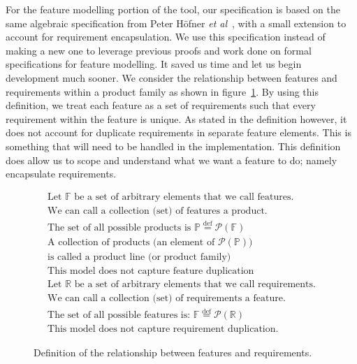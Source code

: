 For the feature modelling portion of the tool, our specification is based on the same algebraic specification from Peter H\"{o}fner \textit{et al}~\cite{hofner2006feature,hofner2011algebra}, with a small extension to account for requirement encapsulation. We use this specification instead of making a new one to leverage previous proofs and work done on formal specifications for feature modelling. It saved us time and let us begin development much sooner. We consider the relationship between features and requirements within a product family as shown in figure~\ref{fig:spec}. By using this definition, we treat each feature as a set of requirements such that every requirement within the feature is unique. As stated in the definition however, it does not account for duplicate requirements in separate feature elements. This is something that will need to be handled in the implementation. This definition does allow us to scope and understand what we want a feature to do; namely encapsulate requirements.
\begin{figure}
\begin{align}
	\text{Let } \mathbb{F} \text{ be a set of arbitrary elements that we call features.}\\
		\text{We can call a collection (set) of features a product.}\\
		\text{The set of all possible products is } \mathbb{P} \overset{\mathrm{def}}{=} \mathcal{P}(\mathbb{F})\\
		\text{A collection of products (an element of } \mathcal{P}(\mathbb{P})\text{)}\\
		\text{is called a product line (or product family)}\\
		\text{This model does not capture feature duplication}\\
		\text{Let } \mathbb{R} \text{ be a set of arbitrary elements that we call requirements.}\\
		\text{We can call a collection (set) of requirements a feature.}\\
		\text{The set of all possible features is: } \mathbb{F} \overset{\mathrm{def}}{=} \mathcal{P}(\mathbb{R})\\
		\text{This model does not capture requirement duplication.}
\end{align}
\caption{Definition of the relationship between features and requirements.}
\label{fig:spec}
\end{figure}

